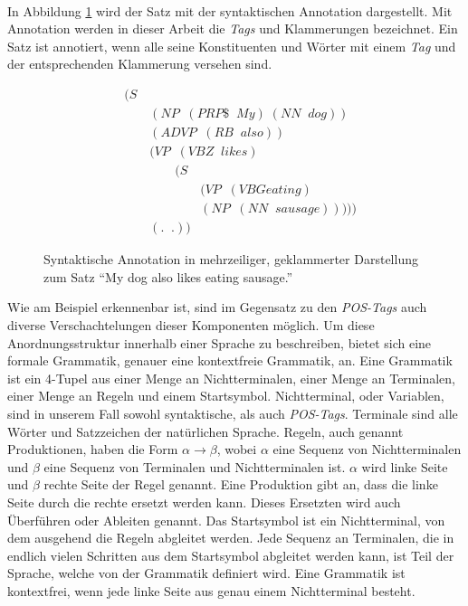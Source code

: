 \\
In Abbildung \ref{fig:multiline-annotated-dog-eating} wird der Satz mit der syntaktischen Annotation dargestellt. Mit Annotation werden in dieser Arbeit die \textit{Tags} und Klammerungen bezeichnet. Ein Satz ist annotiert, wenn alle seine Konstituenten und Wörter mit einem \textit{Tag} und der entsprechenden Klammerung versehen sind.\\
\begin{figure}
\begin{align}
&(S \nonumber \\ 
& \qquad (NP \;\;(PRP\$ \;\; My)\; (NN \;\; dog)) \nonumber \\
& \qquad (ADVP \;\;(RB \;\; also)) \nonumber \\
& \qquad (VP \;\;(VBZ \;\; likes) \nonumber \\
& \qquad \qquad (S \nonumber \\
& \qquad \qquad \qquad (VP \;\;(VBG eating) \nonumber \\
& \qquad \qquad \qquad (NP \;\;(NN \;\; sausage)))))\nonumber \\
& \qquad (. \;\; .)) \nonumber
\end{align}
\caption{Syntaktische Annotation in mehrzeiliger, geklammerter Darstellung zum Satz ``My dog also likes eating sausage.''}
\label{fig:multiline-annotated-dog-eating}
\end{figure}
Wie am Beispiel erkennenbar ist, sind im Gegensatz zu den \textit{POS-Tags} auch diverse Verschachtelungen dieser Komponenten möglich. Um diese Anordnungsstruktur innerhalb einer Sprache zu beschreiben, bietet sich eine formale Grammatik, genauer eine kontextfreie Grammatik, an.
Eine Grammatik ist ein 4-Tupel aus einer Menge an Nichtterminalen, einer Menge an Terminalen, einer Menge an Regeln und einem Startsymbol. Nichtterminal, oder Variablen, sind in unserem Fall sowohl syntaktische, als auch \textit{POS-Tags}. Terminale sind alle Wörter und Satzzeichen der natürlichen Sprache. Regeln, auch genannt Produktionen, haben die Form \( \alpha \to \beta\), wobei \(\alpha\) eine Sequenz von Nichtterminalen und \(\beta\) eine Sequenz von Terminalen und Nichtterminalen ist. \(\alpha\) wird linke Seite und \(\beta\) rechte Seite der Regel genannt. Eine Produktion gibt an, dass die linke Seite durch die rechte ersetzt werden kann. Dieses Ersetzten wird auch Überführen oder Ableiten genannt. Das Startsymbol ist ein Nichtterminal, von dem ausgehend die Regeln abgleitet werden. Jede Sequenz an Terminalen, die in endlich vielen Schritten aus dem Startsymbol abgleitet werden kann, ist Teil der Sprache, welche von der Grammatik definiert wird. Eine Grammatik ist kontextfrei, wenn jede linke Seite aus genau einem Nichtterminal besteht. \cite[Kapitel 4]{ti}\\
